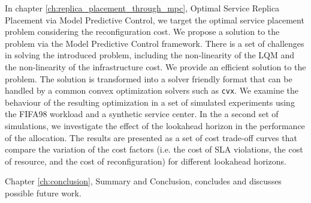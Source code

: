  In chapter \ref{ch:replica_placement_through_mpc}, Optimal Service Replica Placement via Model Predictive Control, we target the optimal service placement problem considering the reconfiguration cost. We  propose a solution to the problem via the Model Predictive Control framework.  
There is a set of challenges in solving the introduced problem, including the non-linearity of the LQM and the non-linearity of the infrastructure cost. We provide an efficient solution to the problem. The solution is transformed into a solver friendly format that can be handled by a common convex optimization solvers such as \texttt{cvx}.
We examine the behaviour of the resulting optimization in a set of simulated experiments using the FIFA98 workload and a synthetic service center. In the a second set of simulations, we investigate the effect of the lookahead horizon in the performance of the allocation. The results are presented as a set of cost trade-off curves that compare the variation of the cost factors (i.e. the cost of SLA violations, the cost of resource, and the cost of reconfiguration) for different lookahead horizons.

  Chapter \ref{ch:conclusion}, Summary and Conclusion, concludes and discusses possible future work.      



